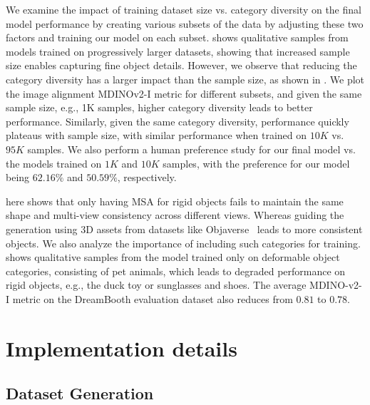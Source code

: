 We examine the impact of training dataset size vs. category diversity on the final model performance by creating various subsets of the data by adjusting these two factors and training our model on each subset.  shows qualitative samples from models trained on progressively larger datasets, showing that increased sample size enables capturing fine object details. However, we observe that reducing the category diversity has a larger impact than the sample size, as shown in . We plot the image alignment MDINOv2-I metric for different subsets, and given the same sample size, e.g., 1K samples, higher category diversity leads to better performance. Similarly, given the same category diversity, performance quickly plateaus with sample size, with similar performance when trained on $10K$ vs. $95K$ samples. We also perform a human preference study for our final model vs. the models trained on $1K$ and $10K$ samples, with the preference for our model being $62.16\%$ and $50.59\%$, respectively. 




  here shows that only having MSA for rigid objects fails to maintain the same shape and multi-view consistency across different views. Whereas guiding the generation using 3D assets from datasets like Objaverse~\cite{deitke2023objaverse} leads to more consistent objects. We also analyze the importance of including such categories for training.  shows qualitative samples from the model trained only on deformable object categories, consisting of pet animals, which leads to degraded performance on rigid objects, e.g., the duck toy or sunglasses and shoes. The average MDINO-v2-I metric on the DreamBooth evaluation dataset also reduces from $0.81$ to $0.78$.









\section{Implementation details}

\subsection{Dataset Generation}

